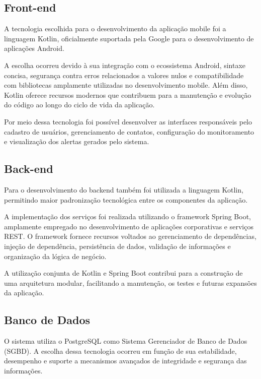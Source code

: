 \subsection{Front-end}

A tecnologia escolhida para o desenvolvimento da aplicação mobile foi a linguagem Kotlin, oficialmente suportada pela Google para o desenvolvimento de aplicações Android.

A escolha ocorreu devido à sua integração com o ecossistema Android, sintaxe concisa, segurança contra erros relacionados a valores nulos e compatibilidade com bibliotecas amplamente utilizadas no desenvolvimento mobile. Além disso, Kotlin oferece recursos modernos que contribuem para a manutenção e evolução do código ao longo do ciclo de vida da aplicação.

Por meio dessa tecnologia foi possível desenvolver as interfaces responsáveis pelo cadastro de usuários, gerenciamento de contatos, configuração do monitoramento e visualização dos alertas gerados pelo sistema.

\subsection{Back-end}

Para o desenvolvimento do backend também foi utilizada a linguagem Kotlin, permitindo maior padronização tecnológica entre os componentes da aplicação.

A implementação dos serviços foi realizada utilizando o framework Spring Boot, amplamente empregado no desenvolvimento de aplicações corporativas e serviços REST. O framework fornece recursos voltados ao gerenciamento de dependências, injeção de dependência, persistência de dados, validação de informações e organização da lógica de negócio.

A utilização conjunta de Kotlin e Spring Boot contribui para a construção de uma arquitetura modular, facilitando a manutenção, os testes e futuras expansões da aplicação.

\subsection{Banco de Dados}

O sistema utiliza o PostgreSQL como Sistema Gerenciador de Banco de Dados (SGBD). A escolha dessa tecnologia ocorreu em função de sua estabilidade, desempenho e suporte a mecanismos avançados de integridade e segurança das informações.

